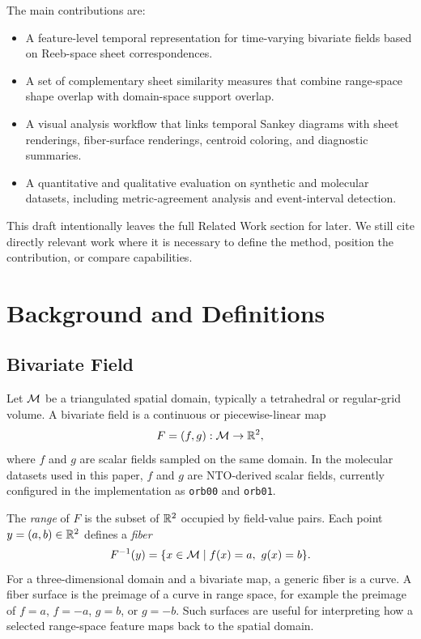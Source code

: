 The main contributions are:
\begin{itemize}
  \item A feature-level temporal representation for time-varying bivariate
  fields based on Reeb-space sheet correspondences.
  \item A set of complementary sheet similarity measures that combine
  range-space shape overlap with domain-space support overlap.
  \item A visual analysis workflow that links temporal Sankey diagrams with
  sheet renderings, fiber-surface renderings, centroid coloring, and
  diagnostic summaries.
  \item A quantitative and qualitative evaluation on synthetic and molecular
  datasets, including metric-agreement analysis and event-interval detection.
\end{itemize}

This draft intentionally leaves the full Related Work section for later. We
still cite directly relevant work where it is necessary to define the method,
position the contribution, or compare capabilities.

\section{Background and Definitions}

\subsection{Bivariate Field}

Let \(\mathcal{M}\) be a triangulated spatial domain, typically a tetrahedral or
regular-grid volume. A bivariate field is a continuous or piecewise-linear map
\[
F=(f,g):\mathcal{M}\rightarrow\mathbb{R}^2,
\]
where \(f\) and \(g\) are scalar fields sampled on the same domain. In the
molecular datasets used in this paper, \(f\) and \(g\) are NTO-derived scalar
fields, currently configured in the implementation as \texttt{orb00} and
\texttt{orb01}.

The \emph{range} of \(F\) is the subset of \(\mathbb{R}^2\) occupied by field-value
pairs. Each point \(y=(a,b)\in\mathbb{R}^2\) defines a \emph{fiber}
\[
F^{-1}(y)=\{x\in\Domain \mid f(x)=a,\ g(x)=b\}.
\]
For a three-dimensional domain and a bivariate map, a generic fiber is a curve.
A fiber surface is the preimage of a curve in range space, for example the
preimage of \(f=a\), \(f=-a\), \(g=b\), or \(g=-b\). Such surfaces are useful
for interpreting how a selected range-space feature maps back to the spatial
domain.

